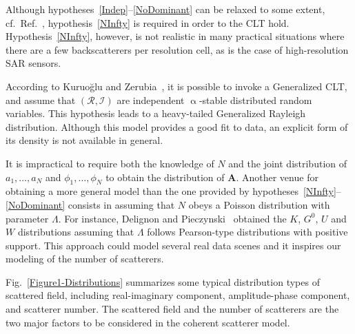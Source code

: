 \documentclass[journal]{IEEEtran}
\begin{document}
Although hypotheses~\ref{Indep}--\ref{NoDominant} can be relaxed to some extent, cf.\ Ref.~\cite[Chapter 2]{ProbabilityTheoryandExamples2005}, hypothesis~\ref{NInfty} is required in order to the CLT hold.
Hypothesis~\ref{NInfty}, however, is not realistic in many practical situations where there are a few backscatterers per resolution cell, as is the case of high-resolution SAR sensors.

According to Kuruo\u glu and Zerubia~\cite{Kuruoglu:2004}, it is possible to invoke a Generalized CLT, and assume that $(\mathcal{R}, \mathcal{I})$ are independent $\upalpha$-stable distributed random variables.
This hypothesis leads to a heavy-tailed Generalized Rayleigh distribution.
Although this model provides a good fit to data, an explicit form of its density is not available in general.

It is impractical to require both the knowledge of $N$ and the joint distribution of $a_1,\dots,a_N$ and $\phi_1,\dots,\phi_N$ to obtain the distribution of $\boldsymbol{A}$. Another venue for obtaining a more general model than the one provided by hypotheses~\ref{NInfty}--\ref{NoDominant} consists in assuming that $N$ obeys a Poisson distribution with parameter $\Lambda$.
For instance,
Delignon and Pieczynski~\cite{Delignon:2002}
obtained the $K$, $G^0$, $U$ and $W$ distributions assuming that $\Lambda$ follows Pearson-type distributions with positive support.
This approach could model several real data scenes and it inspires our modeling of the number of scatterers.


Fig.~\ref{Figure1-Distributions} summarizes some typical distribution types of scattered field, including real-imaginary component, amplitude-phase component, and scatterer number.
The scattered field and the number of scatterers are the two major factors to be considered in the coherent scatterer model.
\end{document}
